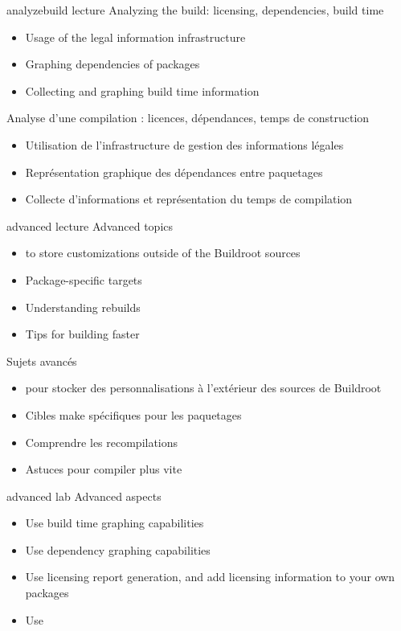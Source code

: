 {analyzebuild}
{lecture}
{Analyzing the build: licensing, dependencies, build time}
{
  \begin{itemize}
  \item Usage of the legal information infrastructure
  \item Graphing dependencies of packages
  \item Collecting and graphing build time information
  \end{itemize}
}
{Analyse d'une compilation : licences, dépendances, temps de
construction}
{
  \begin{itemize}
  \item Utilisation de l'infrastructure de gestion des informations
	légales
  \item Représentation graphique des dépendances entre paquetages
  \item Collecte d'informations et représentation du temps de
	compilation
  \end{itemize}
}
{advanced}
{lecture}
{Advanced topics}
{
  \begin{itemize}
  \item {} to store customizations outside of the
    Buildroot sources
  \item Package-specific targets
  \item Understanding rebuilds
  \item Tips for building faster
  \end{itemize}
}
{Sujets avancés}
{
  \begin{itemize}
  \item {} pour stocker des personnalisations à
	l'extérieur des sources de Buildroot
  \item Cibles make spécifiques pour les paquetages
  \item Comprendre les recompilations
  \item Astuces pour compiler plus vite
  \end{itemize}
}
{advanced}
{lab}
{Advanced aspects}
{
  \begin{itemize}
  \item Use build time graphing capabilities
  \item Use dependency graphing capabilities
  \item Use licensing report generation, and add licensing
    information to your own packages
  \item Use 
  \end{itemize}
}
